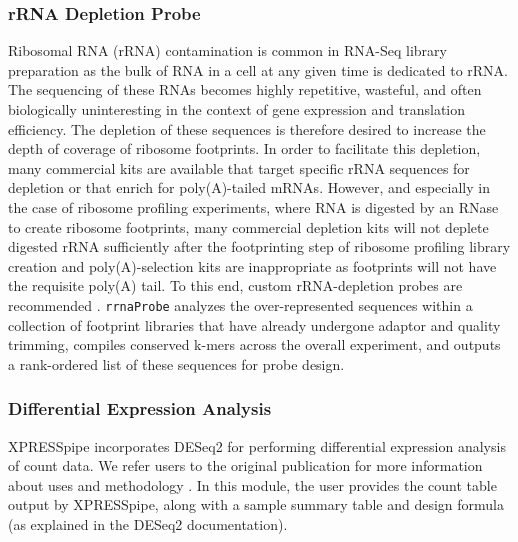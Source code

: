 \documentclass[10pt, oneside]{article}
\begin{document}
\subsubsection{rRNA Depletion Probe}
Ribosomal RNA (rRNA) contamination is common in RNA-Seq library preparation as the bulk of RNA in a cell at any given time is dedicated to rRNA. The sequencing of these RNAs becomes highly repetitive, wasteful, and often biologically uninteresting in the context of gene expression and translation efficiency. The depletion of these sequences is therefore desired to increase the depth of coverage of ribosome footprints. In order to facilitate this depletion, many commercial kits are available that target specific rRNA sequences for depletion or that enrich for poly(A)-tailed mRNAs. However, and especially in the case of ribosome profiling experiments, where RNA is digested by an RNase to create ribosome footprints, many commercial depletion kits will not deplete digested rRNA sufficiently after the footprinting step of ribosome profiling library creation and poly(A)-selection kits are inappropriate as footprints will not have the requisite poly(A) tail. To this end, custom rRNA-depletion probes are recommended \cite{ingolia_meth, ingolia_science}. \texttt{rrnaProbe} analyzes the over-represented sequences within a collection of footprint libraries that have already undergone adaptor and quality trimming, compiles conserved k-mers across the overall experiment, and outputs a rank-ordered list of these sequences for probe design.

\subsubsection{Differential Expression Analysis}
XPRESSpipe incorporates DESeq2 for performing differential expression analysis of count data. We refer users to the original publication for more information about uses and methodology \cite{deseq2}. In this module, the user provides the count table output by XPRESSpipe, along with a sample summary table and design formula (as explained in the DESeq2 documentation).
\end{document}
